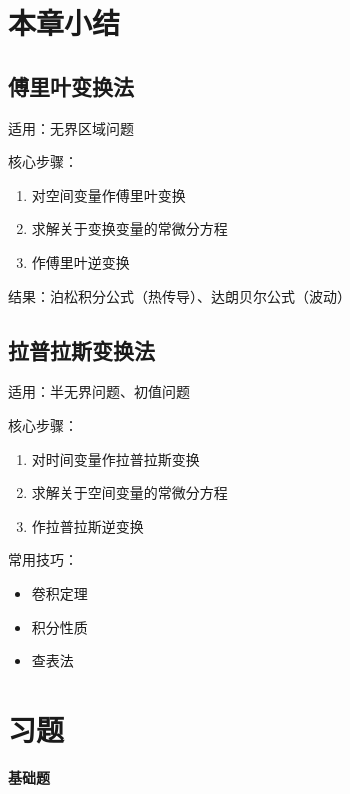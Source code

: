 \section{本章小结}

\subsection{傅里叶变换法}

适用：无界区域问题

核心步骤：
\begin{enumerate}
    \item 对空间变量作傅里叶变换
    \item 求解关于变换变量的常微分方程
    \item 作傅里叶逆变换
\end{enumerate}

结果：泊松积分公式（热传导）、达朗贝尔公式（波动）

\subsection{拉普拉斯变换法}

适用：半无界问题、初值问题

核心步骤：
\begin{enumerate}
    \item 对时间变量作拉普拉斯变换
    \item 求解关于空间变量的常微分方程
    \item 作拉普拉斯逆变换
\end{enumerate}

常用技巧：
\begin{itemize}
    \item 卷积定理
    \item 积分性质
    \item 查表法
\end{itemize}

\section{习题}

\textbf{基础题}

